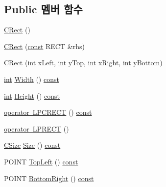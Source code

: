 \subsection*{Public 멤버 함수}
\begin{DoxyCompactItemize}
\item 
\mbox{\hyperlink{class_win_helper_1_1_c_rect_a23555d57c6d6f65272f0bc64378651b8}{C\+Rect}} ()
\item 
\mbox{\hyperlink{class_win_helper_1_1_c_rect_aae968ffaab6da35e85e7fa0e8941aea7}{C\+Rect}} (\mbox{\hyperlink{getopt1_8c_a2c212835823e3c54a8ab6d95c652660e}{const}} R\+E\+CT \&rhs)
\item 
\mbox{\hyperlink{class_win_helper_1_1_c_rect_a3253ffe9a6b650c58100509712805d30}{C\+Rect}} (\mbox{\hyperlink{_util_8cpp_a0ef32aa8672df19503a49fab2d0c8071}{int}} x\+Left, \mbox{\hyperlink{_util_8cpp_a0ef32aa8672df19503a49fab2d0c8071}{int}} y\+Top, \mbox{\hyperlink{_util_8cpp_a0ef32aa8672df19503a49fab2d0c8071}{int}} x\+Right, \mbox{\hyperlink{_util_8cpp_a0ef32aa8672df19503a49fab2d0c8071}{int}} y\+Bottom)
\item 
\mbox{\hyperlink{_util_8cpp_a0ef32aa8672df19503a49fab2d0c8071}{int}} \mbox{\hyperlink{class_win_helper_1_1_c_rect_acde8c61514d7814ab1d7c5f91e549a80}{Width}} () \mbox{\hyperlink{getopt1_8c_a2c212835823e3c54a8ab6d95c652660e}{const}}
\item 
\mbox{\hyperlink{_util_8cpp_a0ef32aa8672df19503a49fab2d0c8071}{int}} \mbox{\hyperlink{class_win_helper_1_1_c_rect_a227070170fb6da9f8539eb9d35749745}{Height}} () \mbox{\hyperlink{getopt1_8c_a2c212835823e3c54a8ab6d95c652660e}{const}}
\item 
\mbox{\hyperlink{class_win_helper_1_1_c_rect_a744e3b6f0a33e7143dbe852d71190875}{operator L\+P\+C\+R\+E\+CT}} () \mbox{\hyperlink{getopt1_8c_a2c212835823e3c54a8ab6d95c652660e}{const}}
\item 
\mbox{\hyperlink{class_win_helper_1_1_c_rect_af8af272cf417faeddfba92f44a8b6cb9}{operator L\+P\+R\+E\+CT}} ()
\item 
\mbox{\hyperlink{class_win_helper_1_1_c_size}{C\+Size}} \mbox{\hyperlink{class_win_helper_1_1_c_rect_a37d2e20ba4edaf4f3ab837862ba73c11}{Size}} () \mbox{\hyperlink{getopt1_8c_a2c212835823e3c54a8ab6d95c652660e}{const}}
\item 
P\+O\+I\+NT \mbox{\hyperlink{class_win_helper_1_1_c_rect_abb394a1600f994a4500c71a48db1b9ad}{Top\+Left}} () \mbox{\hyperlink{getopt1_8c_a2c212835823e3c54a8ab6d95c652660e}{const}}
\item 
P\+O\+I\+NT \mbox{\hyperlink{class_win_helper_1_1_c_rect_a5484884c667466060e54d20f566376a6}{Bottom\+Right}} () \mbox{\hyperlink{getopt1_8c_a2c212835823e3c54a8ab6d95c652660e}{const}}

\end{DoxyCompactItemize}
